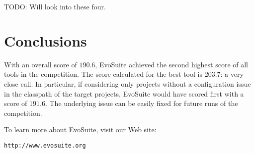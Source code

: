 \documentclass[10pt,conference,compsocconf]{IEEEtran}
\newcommand{\EVOSUITE}{{\sc EvoSuite}\xspace}
\begin{document}
TODO: Will look into these four.



\section{Conclusions}

With an overall score of $190.6$, \EVOSUITE achieved the second
highest score of all tools in the competition. The score calculated
for the best tool is $203.7$: a very close call.  In particular, if
considering only projects without a configuration issue in the
classpath of the target projects, \EVOSUITE would have scored first
with a score of $191.6$.
%
The underlying issue can be easily fixed for future runs of the
competition.


To learn more about \EVOSUITE, visit our Web site:
\begin{center}
\texttt{http://www.evosuite.org}
\end{center}






\def\IEEEbibitemsep{6pt}



\end{document}

